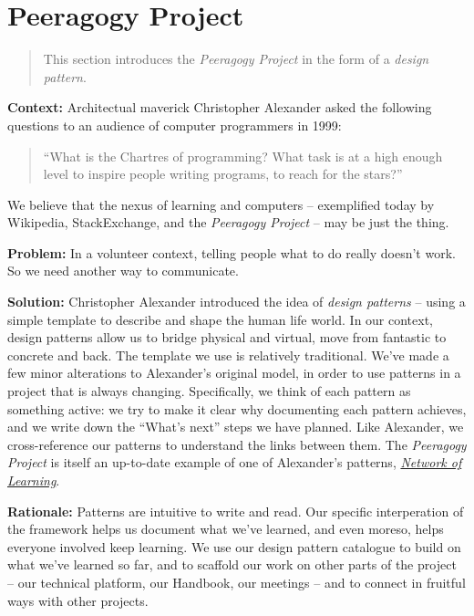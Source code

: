 \section{Peeragogy Project}

\begin{quote}
This section introduces the \emph{Peeragogy Project} in the form of a \emph{design pattern}.
\end{quote}

\textbf{Context:}  Architectual maverick Christopher Alexander asked the following questions to an audience of computer programmers in 1999: 
\begin{quote}
``What is the Chartres of programming? What task is at a high enough level to inspire people writing programs, to reach for the stars?''
\end{quote}
We believe that the nexus of learning and computers -- exemplified today by Wikipedia, StackExchange, and the \emph{Peeragogy Project} -- may be just the thing.

\textbf{Problem:} In a volunteer context, telling people what to do really doesn't work.  So we need another way to communicate.

\textbf{Solution:} Christopher Alexander introduced the idea of \emph{design patterns} -- using a simple template to describe and shape the human life world.  In our context, design patterns allow us to bridge physical and virtual, move from fantastic to concrete and back.  The template we use is relatively traditional.  We've made a few minor alterations to Alexander's original model, in order to use patterns in a project that is always changing.  Specifically, we think of each pattern as something active: we try to make it clear why documenting each pattern achieves, and we write down the ``What's next'' steps we have planned.  Like Alexander, we cross-reference our patterns to understand the links between them.  The \emph{Peeragogy Project} is itself an up-to-date example of one of Alexander's patterns, \href{http://en.wikipedia.org/wiki/Networked_learning#1970s}{\emph{Network of Learning}}.

\textbf{Rationale:}
Patterns are intuitive to write and read.  Our specific interperation of the framework helps us document what we've learned, and even moreso, helps everyone involved keep learning.  We use our design pattern catalogue to build on what we've learned so far, and to scaffold our work on other parts of the project -- our technical platform, our Handbook, our meetings -- and to connect in fruitful ways with other projects.  

